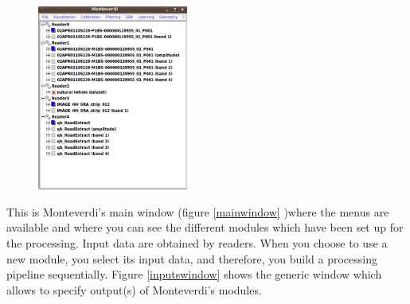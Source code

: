 \begin{figure}
   \center
   \includegraphics[width=0.44\textwidth]{../Art/MonteverdiImages/monteverdi_mainwindow.png}
   \label{fig:mainwindow}
\end{figure}

This is Monteverdi's main window (figure \ref{mainwindow} )where the menus are available and where you can see the different 
modules which have been 
set up for the processing. Input data are obtained by readers. When you choose to use a new module, you select its input data,
 and therefore, you build a processing pipeline sequentially. 
Figure \ref{inputswindow} shows the generic window which allows to specify output(s) of Monteverdi's modules. 
 






